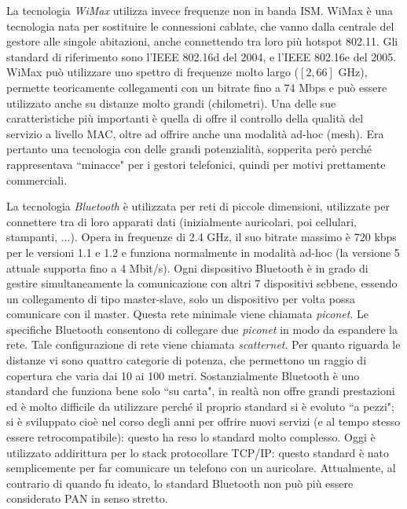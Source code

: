 La tecnologia \textit{WiMax} utilizza invece frequenze non in banda ISM. WiMax è una tecnologia nata per sostituire le connessioni cablate, che vanno dalla centrale del gestore alle singole abitazioni, anche connettendo tra loro più hotspot 802.11. Gli standard di riferimento sono l'IEEE 802.16d del 2004, e l'IEEE 802.16e del 2005. WiMax può utilizzare uno spettro di frequenze molto largo ($[2, 66]$ GHz), permette teoricamente collegamenti con un bitrate fino a 74 Mbps e può essere utilizzato anche su distanze molto grandi (chilometri). Una delle sue caratteristiche più importanti è quella di offre il controllo della qualità del servizio a livello MAC, oltre ad offrire anche una modalità ad-hoc (mesh). Era pertanto una tecnologia con delle grandi potenzialità, sopperita però perché rappresentava \textquotedblleft minacce" per i gestori telefonici, quindi per motivi prettamente commerciali.

La tecnologia \textit{Bluetooth} è utilizzata per reti di piccole dimensioni, utilizzate per connettere tra di loro apparati dati (inizialmente auricolari, poi cellulari, stampanti, $\dots$). Opera in frequenze di 2.4 GHz, il suo bitrate massimo è 720 kbps per le versioni 1.1 e 1.2 e funziona normalmente in modalità ad-hoc (la versione 5 attuale supporta fino a 4 Mbit/s). Ogni dispositivo Bluetooth è in grado di gestire simultaneamente la comunicazione con altri 7 dispositivi sebbene, essendo un collegamento di tipo master-slave, solo un dispositivo per volta possa comunicare con il master. Questa rete minimale viene chiamata \textit{piconet}. Le specifiche Bluetooth consentono di collegare due \textit{piconet} in modo da espandere la rete. Tale configurazione di rete viene chiamata \textit{scatternet}. Per quanto riguarda le distanze vi sono quattro categorie di potenza, che permettono un raggio di copertura che varia dai 10 ai 100 metri. Sostanzialmente Bluetooth è uno standard che funziona bene solo \textquotedblleft su carta", in realtà non offre grandi prestazioni ed è molto difficile da utilizzare perché il proprio standard si è evoluto \textquotedblleft a pezzi"; si è sviluppato cioè nel corso degli anni per offrire nuovi servizi (e al tempo stesso essere retrocompatibile): questo ha reso lo standard molto complesso. Oggi è utilizzato addirittura per lo stack protocollare TCP/IP: questo standard è nato semplicemente per far comunicare un telefono con un auricolare. Attualmente, al contrario di quando fu ideato, lo standard Bluetooth non può più essere considerato PAN in senso stretto.

